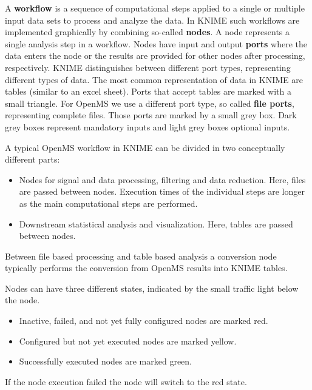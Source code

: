 A \textbf{workflow} is a sequence of computational steps applied to a single or multiple input data sets to process and analyze the data.
In KNIME such workflows are implemented graphically by combining so-called \textbf{nodes}.
A node represents a single analysis step in a workflow.
Nodes have input and output \textbf{ports} where the data enters the node or the results are provided for other nodes after processing, respectively.
KNIME distinguishes between different port types, representing different types of data.
The most common representation of data in KNIME are tables (similar to an excel sheet).
Ports that accept tables are marked with a small triangle.
For OpenMS we use a different port type, so called \textbf{file ports}, representing complete files.
Those ports are marked by a small grey box.
Dark grey boxes represent mandatory inputs and light grey boxes optional inputs.

A typical OpenMS workflow in KNIME can be divided in two conceptually different parts:
\begin{itemize}
\item
Nodes for signal and data processing, filtering and data reduction. Here, files are passed between nodes. Execution times of the individual steps are longer as the main computational steps are performed. 
\item
Downstream statistical analysis and visualization. Here, tables are passed between nodes.
\end{itemize}

Between file based processing and table based analysis a conversion node typically performs the conversion from OpenMS results into KNIME tables.

Nodes can have three different states, indicated by the small traffic light below the node.

\begin{itemize}
\item
Inactive, failed, and not yet fully configured nodes are marked red.
\item
Configured but not yet executed nodes are marked yellow.
\item
Successfully executed nodes are marked green.
\end{itemize}

If the node execution failed the node will switch to the red state.

